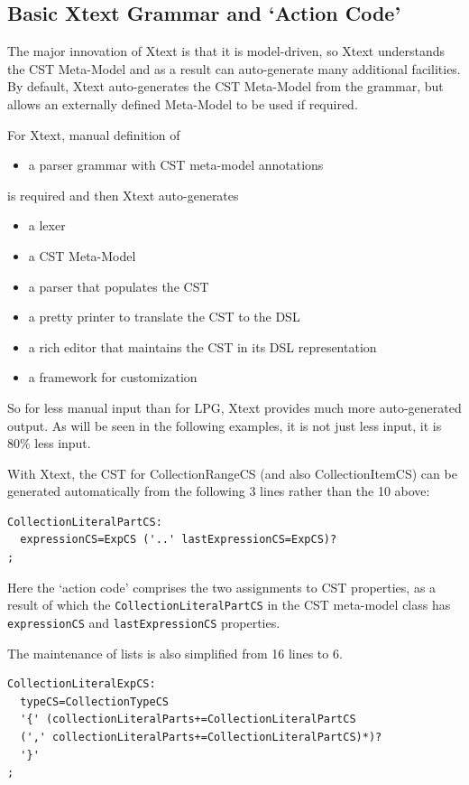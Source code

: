 \documentclass{eceasst}
\begin{document}
\subsection{Basic Xtext Grammar and `Action Code'}

The major innovation of Xtext is that it is model-driven, so Xtext understands the CST Meta-Model and as a result can auto-generate many additional facilities. By default, Xtext auto-generates the CST Meta-Model from the grammar, but allows an externally defined Meta-Model to be used if required.

For Xtext, manual definition of
\begin{itemize}
\item a parser grammar with CST meta-model annotations
\end{itemize}
is required and then Xtext auto-generates
\begin{itemize}
\item a lexer 
\item a CST Meta-Model
\item a parser that populates the CST
\item a pretty printer to translate the CST to the DSL
\item a rich editor that maintains the CST in its DSL representation
\item a framework for customization
\end{itemize}

So for less manual input than for LPG, Xtext provides much more auto-generated output. As will be seen in the following examples, it is not just less input, it is 80\% less input.

With Xtext, the CST for CollectionRangeCS (and also CollectionItemCS) can be generated automatically from the following 3 lines rather than the 10 above:

{\small\begin{verbatim}
CollectionLiteralPartCS:
  expressionCS=ExpCS ('..' lastExpressionCS=ExpCS)?
;
\end{verbatim}}

Here the `action code' comprises the two assignments to CST properties, as a result of which the  \verb#CollectionLiteralPartCS# in the CST meta-model class has \verb#expressionCS# and \verb#lastExpressionCS# properties.

The maintenance of lists is also simplified from 16 lines to 6. 

{\small\begin{verbatim}
CollectionLiteralExpCS:
  typeCS=CollectionTypeCS
  '{' (collectionLiteralParts+=CollectionLiteralPartCS
  (',' collectionLiteralParts+=CollectionLiteralPartCS)*)?
  '}'
;
\end{verbatim}}
\end{document}

